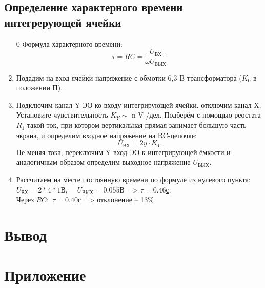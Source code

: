 \documentclass[14pt,a4paper]{article}
\begin{document}
\subsection*{Определение характерного времени интегрерующей ячейки}\begin{enumerate}
  \item[0] Формула характерного времени:
  $$\tau = RC = \frac{U_\text{ВХ}}{\omega U_\text{ВЫХ}}$$
  \item Подадим на вход ячейки
  напряжение с обмотки 6,3 B трансформатора ($K_0$ в положении П).
  \item Подключим канал Y ЭО ко входу интегрирующей ячейки, отключим канал X. Установите чувствительность $K_Y \sim$ n V /дел. Подберём с помощью реостата $R_1$ такой ток, при котором вертикальная прямая занимает
  большую часть экрана, и определим входное напряжение на RC-цепочке:
  $$U_\text{ВХ} = 2y \cdot K_Y$$
  Не меняя тока, переключим Y-вход ЭО к интегрирующей ёмкости и
  аналогичным образом определим выходное напряжение $U_\text{ВЫХ}$.
  \item  Рассчитаем на месте постоянную времени по формуле из нулевого пункта:\\
  $U_\text{ВХ} = 2 * 4 * 1$В, \ \  $U_\text{ВЫХ} = 0.055$В => \underline{$\tau = 0.46$с}.\\
  Через $RC:$ $\tau = 0.40$с => отклонение -- 13\%
\end{enumerate}

\section*{Вывод}

\newpage
\section*{Приложение}
\end{document}
